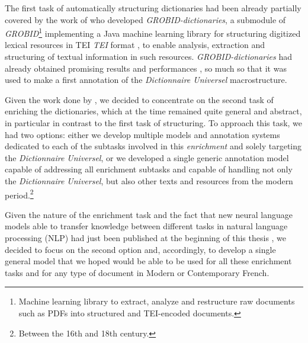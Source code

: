 The first task of automatically structuring dictionaries had been already partially covered by the work of \citet{khemakhem-etal-2017-automatic,khemakhem-etal-2018-enhancing} who developed \emph{GROBID-dictionaries}, a submodule of \emph{GROBID}\footnote{Machine learning library to extract, analyze and restructure raw documents such as PDFs into structured and TEI-encoded documents.} \citep{lopez-etal-2018-grobid} implementing a Java machine learning library for structuring digitized lexical resources in TEI \emph{TEI} format \citep{tei-2018-guidelines}, to enable analysis, extraction and structuring of textual information in such resources. \emph{GROBID-dictionaries} had already obtained promising results and performances \citep{khemakhem-2020-standard}, so much so that it was used to make a first annotation of the \emph{Dictionnaire Universel} macrostructure.

Given the work done by \citet{khemakhem-2020-standard}, we decided to concentrate on the second task of enriching the dictionaries, which at the time remained quite general and abstract, in particular in contrast to the first task of structuring. To approach this task, we had two options: either we develop multiple models and annotation systems dedicated to each of the subtasks involved in this \emph{enrichment} and solely targeting the \emph{Dictionnaire Universel}, or we developed a single generic annotation model capable of addressing all enrichment subtasks and capable of handling not only the \emph{Dictionnaire Universel}, but also other texts and resources from the modern period.\footnote{Between the 16th and 18th century.}

Given the nature of the enrichment task and the fact that new neural language models able to transfer knowledge between different tasks in natural language processing (NLP) had just been published at the beginning of this thesis \citep{peters-etal-2018-deep,devlin-etal-2019-bert}, we decided to focus on the second option and, accordingly, to develop a single general model that we hoped would be able to be used for all these enrichment tasks and for any type of document in Modern or Contemporary French.

